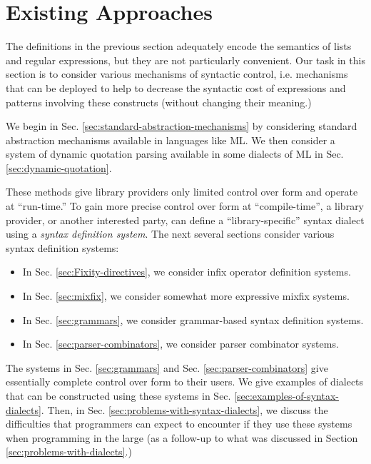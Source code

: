 \section{Existing Approaches}\label{sec:existing-approaches}
The definitions in the previous section adequately encode the semantics of lists and regular expressions, but they are not particularly convenient. Our task in this section is to consider various mechanisms of syntactic control, i.e. mechanisms that can be deployed to help to decrease the syntactic cost of expressions and patterns involving these constructs (without changing their meaning.)


We begin in Sec. \ref{sec:standard-abstraction-mechanisms} by considering standard abstraction mechanisms available in languages like ML. We then consider a system of dynamic quotation parsing available in some dialects of ML in Sec. \ref{sec:dynamic-quotation}. 

These methods give library providers only limited control over form and operate at ``run-time.'' To gain more precise control over form at ``compile-time'', a library provider, or another interested party, can define a ``library-specific'' syntax dialect using a \emph{syntax definition system}. The next several sections consider various syntax definition systems:
\begin{itemize}
\item In Sec. \ref{sec:Fixity-directives}, we consider infix operator definition systems.
\item In Sec. \ref{sec:mixfix}, we consider somewhat more expressive mixfix systems.
\item In Sec. \ref{sec:grammars}, we consider grammar-based syntax definition systems.
\item In Sec. \ref{sec:parser-combinators}, we consider parser combinator systems.
\end{itemize}
The systems in Sec. \ref{sec:grammars} and Sec. \ref{sec:parser-combinators} give essentially complete control over form to their users. We give examples of dialects that can be constructed using these systems in Sec. \ref{sec:examples-of-syntax-dialects}. Then, in Sec. \ref{sec:problems-with-syntax-dialects}, we discuss the difficulties that programmers can expect to encounter if they  use these systems when programming in the large (as a follow-up to what was discussed in Section \ref{sec:problems-with-dialects}.)

